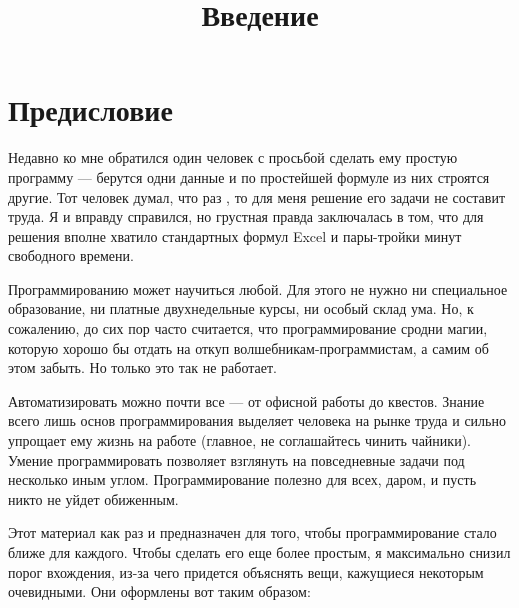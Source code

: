 \documentclass{article}
\begin{document}


\title{\textbf{\Huge Введение}}
\author{}
\date{}

\maketitle %

\section*{Предисловие}

Недавно ко мне обратился один человек с просьбой сделать ему простую программу --- берутся одни данные и по простейшей формуле из них строятся другие. Тот человек думал, что раз \grqq, то для меня решение его задачи не составит труда. Я и вправду справился, но грустная правда заключалась в том, что для решения вполне хватило стандартных формул Excel и пары-тройки минут свободного времени.

Программированию может научиться любой. Для этого не нужно ни специальное образование, ни платные двухнедельные курсы, ни особый склад ума. Но, к сожалению, до сих пор часто считается, что программирование сродни магии, которую хорошо бы отдать на откуп волшебникам-программистам, а самим об этом забыть. Но только это так не работает. 

Автоматизировать можно почти все --- от офисной работы до квестов. Знание всего лишь основ программирования выделяет человека на рынке труда и сильно упрощает ему жизнь на работе (главное, не соглашайтесь чинить чайники). Умение программировать позволяет взглянуть на повседневные задачи под несколько иным углом. Программирование полезно для всех, даром, и пусть никто не уйдет обиженным.

Этот материал как раз и предназначен для того, чтобы программирование стало ближе для каждого. Чтобы сделать его еще более простым, я максимально снизил порог вхождения, из-за чего придется объяснять вещи, кажущиеся некоторым очевидными. Они оформлены вот таким образом:
\end{document}
